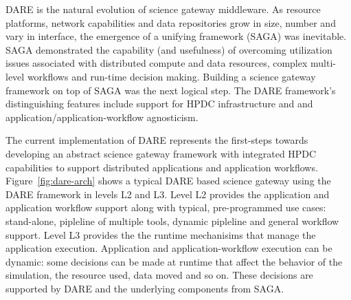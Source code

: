 \documentclass[]{svjour3}
\begin{document}

DARE is the natural evolution of science gateway middleware. As
resource platforms, network capabilities and data repositories grow in
size, number and vary in interface, the emergence of a unifying
framework (SAGA) was inevitable.  SAGA demonstrated the capability
(and usefulness) of overcoming utilization issues associated with
distributed compute and data resources, complex multi-level workflows
and run-time decision making. Building a science gateway framework on
top of SAGA was the next logical step. The DARE framework's
distinguishing features include support for HPDC infrastructure and
and application/application-workflow agnosticism.  



The current implementation of DARE represents the first-steps towards developing
an abstract science gateway framework with integrated HPDC capabilities to support
distributed applications and application workflows. Figure~\ref{fig:dare-arch}
shows a typical DARE based science gateway using the DARE framework in
levels L2 and L3. Level L2 provides the application and application workflow
support along with typical, pre-programmed use cases: stand-alone, pipleline of
multiple tools, dynamic pipleline and general workflow support. Level L3 provides
the the runtime mechanisims that manage the application execution. Application
and application-workflow execution can be dynamic: some decisions can be made
at runtime that affect the behavior of the simulation, the resource used,
data moved and so on. These decisions are supported by DARE and the
underlying components from SAGA.
\end{document}
